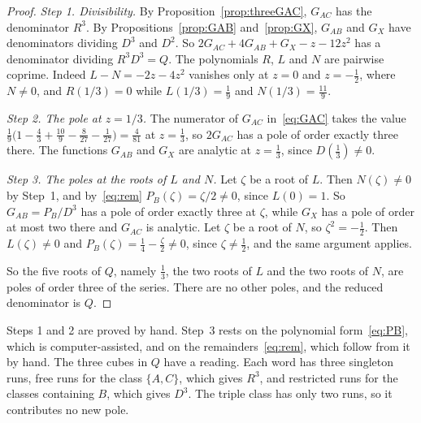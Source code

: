 \begin{proof}
\emph{Step 1. Divisibility.} By Proposition~\ref{prop:threeGAC}, $G_{AC}$ has the denominator
$R^3$. By Propositions~\ref{prop:GAB} and~\ref{prop:GX}, $G_{AB}$ and $G_X$ have denominators
dividing $D^3$ and $D^2$. So $2G_{AC}+4G_{AB}+G_X-z-12z^2$ has a denominator dividing
$R^3D^3=Q$. The polynomials $R$, $L$ and $N$ are pairwise coprime. Indeed $L-N=-2z-4z^2$ vanishes only at $z=0$ and $z=-\frac12$, where $N\ne0$, and
$R(1/3)=0$ while $L(1/3)=\frac19$ and $N(1/3)=\frac{11}9$.

\emph{Step 2. The pole at $z=1/3$.} The numerator of $G_{AC}$ in~\eqref{eq:GAC} takes the
value $\frac19\bigl(1-\frac43+\frac{10}9-\frac8{27}-\frac1{27}\bigr)=\frac4{81}$ at
$z=\frac13$, so $2G_{AC}$ has a pole of order exactly three there. The functions $G_{AB}$ and
$G_X$ are analytic at $z=\frac13$, since $D(\frac13)\ne0$.

\emph{Step 3. The poles at the roots of $L$ and $N$.} Let $\zeta$ be a root of $L$. Then
$N(\zeta)\ne0$ by Step~1, and by~\eqref{eq:rem} $P_B(\zeta)=\zeta/2\ne0$, since $L(0)=1$. So
$G_{AB}=P_B/D^3$ has a pole of order exactly three at $\zeta$, while $G_X$ has a pole of order
at most two there and $G_{AC}$ is analytic. Let $\zeta$ be a root of $N$, so
$\zeta^2=-\frac12$. Then $L(\zeta)\ne0$ and $P_B(\zeta)=\frac14-\frac\zeta2\ne0$, since
$\zeta\ne\frac12$, and the same argument applies.

So the five roots of $Q$, namely $\frac13$, the two roots of $L$ and the two roots of $N$, are
poles of order three of the series. There are no other poles, and the reduced denominator is
$Q$.
\end{proof}

Steps 1 and 2 are proved by hand. Step~3 rests on the polynomial form~\eqref{eq:PB}, which
is computer-assisted, and on the remainders~\eqref{eq:rem}, which follow from it by hand. The
three cubes in $Q$ have a reading. Each word has three singleton runs, free runs for the class
$\{A,C\}$, which gives $R^3$, and restricted runs for the classes containing $B$, which gives
$D^3$. The triple class has only two runs, so it contributes no new pole.
